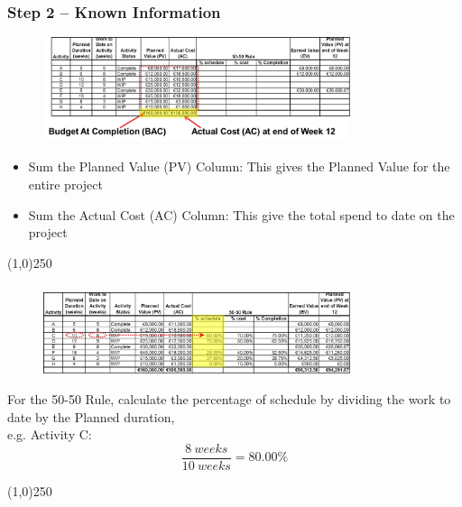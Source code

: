 \begin{frame}
\frametitle{Step 2 – Known Information}

\begin{figure}
	\centering
		\includegraphics[width = 9cm]{images/evmstep2.jpg}
	\label{fig:evmstep2}
\end{figure}
\begin{itemize}
	\item Sum the Planned Value (PV) Column: This gives the Planned Value for the entire project
	\item Sum the Actual Cost (AC) Column: This give the total spend to date on the project
\end{itemize}
\end{frame}
\begin{center}\line(1,0){250}\end{center}






\begin{frame}
\frametitle{}
\begin{figure}
	\centering
		\includegraphics[width = 9cm]{images/evmstep3.jpg}
	\label{fig:evmstep3}
\end{figure}
For the 50-50 Rule, calculate the percentage of schedule by dividing the work to date by the Planned duration,\\ e.g. Activity C:
\[
\frac{8 \: weeks}{10 \: weeks} = 80.00\% 
\] 
\end{frame}
\begin{center}\line(1,0){250}\end{center}






